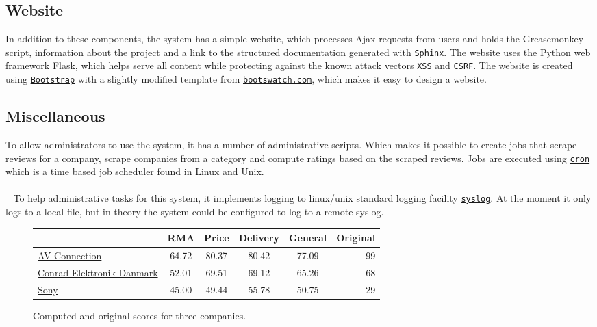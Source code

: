 \documentclass[10pt]{IEEEtran}
\begin{document}
\subsection{Website}
In addition to these components, the system has a simple website, which processes Ajax requests from users and holds the Greasemonkey script, information about the project and a link to the structured documentation generated with \href{http://sphinx-doc.org/}{\texttt{Sphinx}}. The website uses the Python web framework Flask, which helps serve all content while protecting against the known attack vectors \href{https://www.owasp.org/index.php/Cross-site_Scripting_(XSS)}{\texttt{XSS}} and \href{https://www.owasp.org/index.php/Cross-Site_Request_Forgery_(CSRF)}{\texttt{CSRF}}. The website is created using \href{http://getbootstrap.com/}{\texttt{Bootstrap}} with a slightly modified template from \href{http://bootswatch.com/flatly/}{\texttt{bootswatch.com}}, which makes it easy to design a website.

\subsection{Miscellaneous}
To allow administrators to use the system, it has a number of administrative scripts. Which makes it possible to create jobs that scrape reviews for a company, scrape companies from a category and compute ratings based on the scraped reviews. Jobs are executed using \href{http://pubs.opengroup.org/onlinepubs/009696699/utilities/crontab.html}{\texttt{cron}} which is a time based job scheduler found in Linux and Unix.
\\~
\\~
To help administrative tasks for this system, it implements logging to linux/unix standard logging facility \href{http://tools.ietf.org/html/rfc5424}{\texttt{syslog}}. At the moment it only logs to a local file, but in theory the system could be configured to log to a remote syslog.

\begin{figure*}[!ht]
	\vspace*{10mm}
	\hspace*{25mm}	
	\begin{tabular}{ | l | c | c | c | c | r | }
  		\hline
   		 & \textbf{RMA} & \textbf{Price} & \textbf{Delivery} & \textbf{General} & \textbf{Original} \\ \hline
  		\href{http://www.trustpilot.dk/review/www.av-connection.dk}{AV-Connection} & 64.72 & 80.37 & 80.42 & 77.09 & 99 \\ \hline
  		\href{http://www.trustpilot.dk/review/www.conradelektronik.dk}{Conrad Elektronik Danmark} & 52.01 & 69.51 & 69.12 & 65.26 & 68 \\ \hline
  		\href{http://www.trustpilot.dk/review/www.sony.dk}{Sony}  & 45.00 & 49.44 & 55.78 & 50.75 & 29 \\ \hline
	\end{tabular}
	\hspace*{30mm}	
	\caption{Computed and original scores for three companies. \label{fig:scores}}
\end{figure*}
\end{document}
